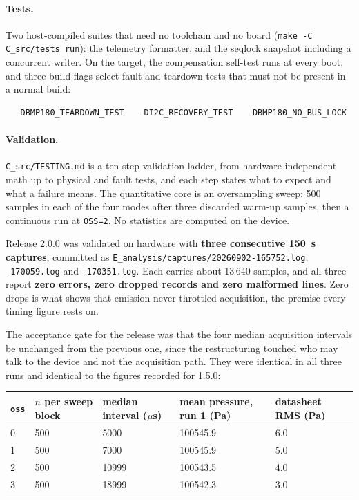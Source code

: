 \documentclass[10pt,a4]{article}
\begin{document}
\paragraph{Tests.} Two host-compiled suites that need no toolchain and no
board (\texttt{make -C C\_src/tests run}): the telemetry formatter, and the
seqlock snapshot including a concurrent writer. On the target, the compensation
self-test runs at every boot, and three build flags select fault and teardown
tests that must not be present in a normal build:

\begin{verbatim}
  -DBMP180_TEARDOWN_TEST   -DI2C_RECOVERY_TEST   -DBMP180_NO_BUS_LOCK
\end{verbatim}

\paragraph{Validation.}
\label{sec:testing}
\texttt{C\_src/TESTING.md} is a ten-step validation ladder, from
hardware-independent math up to physical and fault tests, and each step states
what to expect and what a failure means. The quantitative core is an
oversampling sweep: 500 samples in each of the four modes after three discarded
warm-up samples, then a continuous run at \texttt{OSS=2}. No statistics are
computed on the device.

Release 2.0.0 was validated on hardware with \textbf{three consecutive 150~s
captures}, committed as
\texttt{E\_analysis/captures/20260902-165752.log},
\texttt{-170059.log} and \texttt{-170351.log}. Each carries about 13\,640
samples, and all three report \textbf{zero errors, zero dropped records and zero
malformed lines}. Zero drops is what shows that emission never throttled
acquisition, the premise every timing figure rests on.

The acceptance gate for the release was that the four median acquisition
intervals be unchanged from the previous one, since the restructuring touched
who may talk to the device and not the acquisition path. They were identical in
all three runs and identical to the figures recorded for 1.5.0:

\begin{center}
\begin{tabular}{lllll}
\texttt{oss} & $n$ per sweep block & median interval ($\mu$s) & mean pressure, run 1 (Pa) & datasheet RMS (Pa) \\
\hline
0 & 500 & 5000 & 100545.9 & 6.0 \\
1 & 500 & 7000 & 100545.9 & 5.0 \\
2 & 500 & 10999 & 100543.5 & 4.0 \\
3 & 500 & 18999 & 100542.3 & 3.0 \\
\end{tabular}
\end{center}
\end{document}
